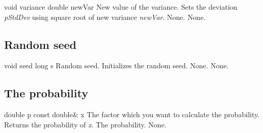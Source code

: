 \setNormalInstance
\printMethodWithOneParam
{void}
{variance}
{double}
{newVar}
{New value of the variance.}
{Sets the deviation {\em pStdDev} using square root of new variance
{\em newVar}.}
{None.}
{None.}

\vspace*{10mm}

\subsection{Random seed}

\setNormalInstance
\printMethodWithOneParam
{void}
{seed}
{long}
{s}
{Random seed.}
{Initializes the random seed.}
{None.}
{None.}

\vspace*{10mm}

\subsection{The probability}

\setConstInstance
\printMethodWithOneParam
{double}
{p}
{const double\&}
{x}
{The factor which you want to calculate the probability.}
{Returns the probability of {\em x}.}
{The probability.}
{None.}













